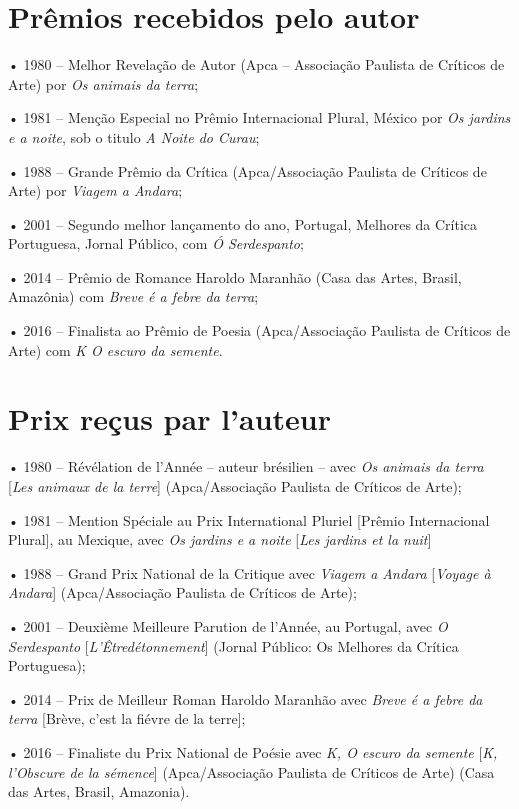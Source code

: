 \chapter{Prêmios recebidos pelo autor}



\forceindent{}• 1980 -- Melhor Revelação de Autor (Apca -- Associação Paulista de
Críticos de Arte) por \emph{Os animais da terra};

• 1981 -- Menção Especial no Prêmio Internacional Plural, México por \emph{Os jardins e a noite}, sob o titulo \emph{A Noite do Curau};

• 1988 -- Grande Prêmio da Crítica (Apca/Associação Paulista de Críticos de
Arte) por \emph{Viagem a Andara};

• 2001 -- Segundo melhor lançamento do ano, Portugal, Melhores da Crítica
Portuguesa, Jornal Público, com \emph{Ó Serdespanto};

• 2014 -- Prêmio de Romance Haroldo Maranhão (Casa das Artes, Brasil, Amazônia) com \emph{Breve é a febre da terra};

• 2016 -- Finalista ao Prêmio de Poesia (Apca/Associação Paulista de
Críticos de Arte) com \emph{K O escuro da semente}.

\chapter{Prix reçus par l'auteur}

\forceindent{}• 1980 -- Révélation de l'Année -- auteur brésilien -- avec \emph{Os animais
da terra} [\emph{Les animaux de la terre}] (Apca/Associação Paulista de Críticos de Arte);

• 1981 -- Mention Spéciale au Prix International Pluriel [Prêmio
Internacional Plural], au Mexique, avec \emph{Os jardins e a noite} [\emph{Les jardins et la nuit}]

• 1988 -- Grand Prix National de la Critique avec \emph{Viagem a Andara} [\emph{Voyage à Andara}]
(Apca/Associação Paulista de Críticos de Arte);

• 2001 -- Deuxième Meilleure Parution de l'Année, au Portugal, avec \emph{O Serdespanto} [\emph{L'Êtredétonnement}] (Jornal Público: Os Melhores da Crítica Portuguesa);

• 2014 -- Prix de Meilleur Roman Haroldo Maranhão avec \emph{Breve é a
febre da terra} [Brève, c'est la fiévre de la terre];

• 2016 -- Finaliste du Prix National de Poésie avec \emph{K, O escuro da semente} [\emph{K, l'Obscure de la sémence}] (Apca/Associação Paulista de Críticos de Arte) (Casa das Artes, Brasil, Amazonia).
